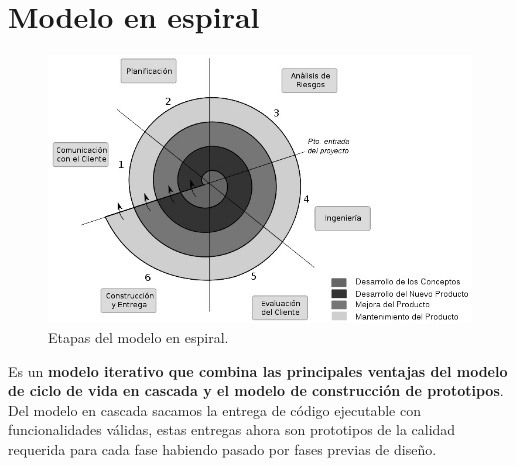 \section{Modelo en espiral}

 \begin{figure}[H]
  \centering
  \includegraphics[width=0.7\linewidth]{Resources/modeloEspiral.jpg}
  \caption{Etapas del modelo en espiral.}
  \label{fig:modeloEspiral}
\end{figure}

Es un \textbf{modelo iterativo que combina las principales ventajas del modelo de ciclo de vida en cascada y el modelo de construcción de prototipos}. Del modelo en cascada sacamos la entrega de código ejecutable con funcionalidades válidas, estas entregas ahora son prototipos de la calidad requerida para cada fase habiendo pasado por fases previas de diseño.\\

